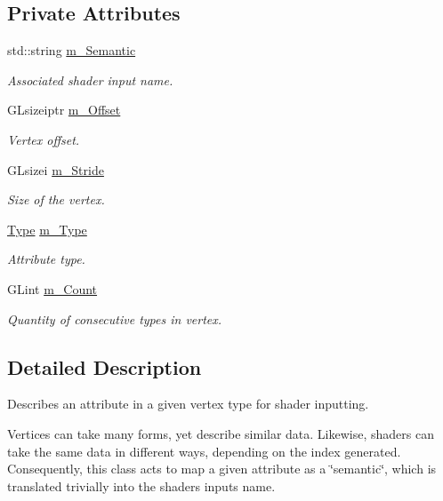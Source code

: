 \subsection*{Private Attributes}
\begin{DoxyCompactItemize}
\item 
std\+::string \hyperlink{class_vertex_attribute_abff460f38ece89d9eccdb6c92e667ebd}{m\+\_\+\+Semantic}
\begin{DoxyCompactList}\small\item\em Associated shader input name. \end{DoxyCompactList}\item 
G\+Lsizeiptr \hyperlink{class_vertex_attribute_af9c032cbe6af149b1e43f7e470aa9078}{m\+\_\+\+Offset}
\begin{DoxyCompactList}\small\item\em Vertex offset. \end{DoxyCompactList}\item 
G\+Lsizei \hyperlink{class_vertex_attribute_af1d7ac6261c307a4ba190dbc65f0d083}{m\+\_\+\+Stride}
\begin{DoxyCompactList}\small\item\em Size of the vertex. \end{DoxyCompactList}\item 
\hyperlink{class_vertex_attribute_abe7f703a33ec0d67ecd975c08dc33f9b}{Type} \hyperlink{class_vertex_attribute_a5ad1bf49939bd899afb0896d99b441a8}{m\+\_\+\+Type}
\begin{DoxyCompactList}\small\item\em Attribute type. \end{DoxyCompactList}\item 
G\+Lint \hyperlink{class_vertex_attribute_a3152574c68d7bede1302f6ec6f78b065}{m\+\_\+\+Count}
\begin{DoxyCompactList}\small\item\em Quantity of consecutive types in vertex. \end{DoxyCompactList}\end{DoxyCompactItemize}


\subsection{Detailed Description}
Describes an attribute in a given vertex type for shader inputting. 

Vertices can take many forms, yet describe similar data. Likewise, shaders can take the same data in different ways, depending on the index generated. Consequently, this class acts to map a given attribute as a \char`\"{}semantic\char`\"{}, which is translated trivially into the shaders\textquotesingle{} input\textquotesingle{}s name.

